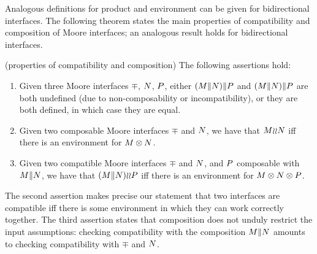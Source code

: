 
\noindent
Analogous definitions for product and environment can be given for
bidirectional interfaces. 
The following theorem states the main properties of compatibility and
composition of Moore interfaces; an analogous result holds for
bidirectional interfaces. 

\begin{theo}{(properties of compatibility and composition)}
The following assertions hold: 
%
\begin{enumerate}

\item %
Given three Moore interfaces $\mp$,
$N$, $P$, either $(M \| N) \| P$ and $(M \| N) \| P$
are both undefined (due to non-composability or incompatibility), or
they are both defined, in which case they are equal.

\item %
Given two composable Moore interfaces $\mp$ and $N$, we have that $M
{\wr}{\wr} N$ iff there is an environment for $M\otimes N$. 

\item %
Given two compatible Moore interfaces $\mp$ and $N$, 
and $P$ composable with $M\|N$, 
we have that $(M\|N) {\wr}{\wr} P$ iff there is an environment 
for $M\otimes N\otimes P$. 

\end{enumerate}
\end{theo}

\noindent
The second assertion makes precise our statement that two interfaces
are compatible iff there is some environment in which they can work
correctly together. 
The third assertion states that composition does not unduly restrict
the input assumptions: checking compatibility with the composition
$M\|N$ amounts to checking compatibility with $\mp$ and $N$. 

